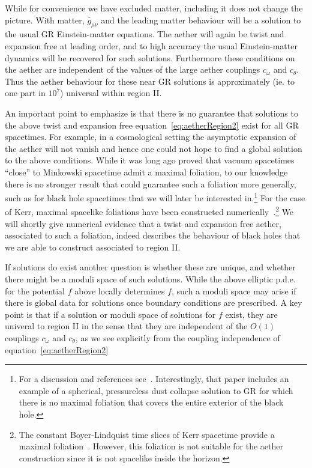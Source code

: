 \documentclass[12pt]{article}
\numberwithin{equation}{section}
\begin{document}
While for convenience we have excluded matter, including it
does not change the picture. With matter, $\bar{g}_{\mu\nu}$ and the leading matter behaviour will be a solution to the usual GR Einstein-matter equations. The aether will again be twist and expansion free at leading order, and to high accuracy the usual Einstein-matter dynamics will be recovered for such solutions. Furthermore these conditions on the aether are independent of the values of the large aether couplings $c_{\omega}$ and $c_\theta$. Thus the 
aether behaviour for these near GR solutions is approximately (ie. to one part in $10^7$) universal within region II.

An important point to emphasize is that there is no guarantee that solutions to the above twist and expansion free  equation~\eqref{eq:aetherRegion2} exist for all GR spacetimes. For example, in a cosmological setting the asymptotic expansion of the aether will not vanish and hence one could not hope to find a global solution to the above conditions. 
While it was long
ago proved that vacuum spacetimes ``close'' to Minkowski spacetime
 admit a maximal foliation, to our knowledge there is no stronger result that could guarantee such a foliation more generally, such as for black hole spacetimes that we will later be interested in.\footnote{For a discussion and references see~\cite{Eardley:1978tr}. Interestingly, that paper includes an example of a spherical, pressureless dust collapse solution
 to GR for which there is no maximal foliation that covers the entire exterior of the black hole. 
 } 
For the case of Kerr, maximal spacelike foliations have been constructed numerically~\cite{PhysRevD.31.1267}.\footnote{
The constant Boyer-Lindquist time slices of Kerr spacetime provide a
maximal foliation~\cite{Gomes:2013bbl,Bergamini:2003ch}. However, this
foliation is not
suitable for the aether construction since it is not spacelike inside the horizon.
}
%
We will shortly give numerical evidence that a twist and expansion free aether, associated to such a foliation, indeed describes the behaviour of black holes that we are able to construct associated to region II.

 
If solutions do exist another question is whether these are unique, and whether there might be a moduli space of such solutions. While the above elliptic p.d.e. for the potential $f$ above locally determines $f$, such a moduli space may arise if there is global data for solutions once boundary conditions are prescribed.
A key point is that if a solution or moduli space of solutions for $f$ exist, they are univeral to region II in the sense that they are independent of the $O(1)$ couplings $c_\omega$ and $c_\theta$, as we see explicitly from the coupling independence of equation~\eqref{eq:aetherRegion2}
\end{document}
